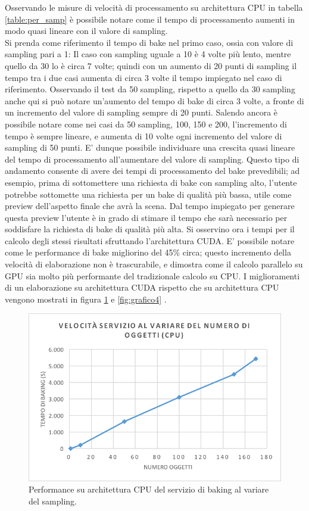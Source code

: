 Osservando le misure di velocità di processamento su architettura CPU in tabella \ref{table:per_samp} è possibile notare come il tempo di processamento aumenti in modo quasi lineare con il valore di sampling.
\\
Si prenda come riferimento il tempo di bake nel primo caso, ossia con valore di sampling pari a 1:
Il caso con sampling uguale a 10 è 4 volte più lento, mentre quello da 30 lo è circa 7 volte; quindi con un aumento di 20 punti di sampling il tempo tra i due casi aumenta di circa 3 volte il tempo impiegato nel caso di riferimento. Osservando il test da 50 sampling, rispetto a quello da 30 sampling anche qui si può notare un’aumento del tempo di bake di circa 3 volte, a fronte di un incremento del valore di sampling sempre di 20 punti. Salendo ancora è possibile notare come nei casi da 50 sampling, 100, 150 e 200, l’incremento di tempo è sempre lineare, e aumenta di 10 volte ogni incremento del valore di sampling di 50 punti. E’ dunque possibile individuare una crescita quasi lineare del tempo di processamento all’aumentare del valore di sampling.
Questo tipo di andamento consente di avere dei tempi di processamento del bake prevedibili; ad esempio, prima di sottomettere una richiesta di bake con sampling alto, l’utente potrebbe sottomette una richiesta per un bake di qualità più bassa, utile come preview dell’aspetto finale che avrà la scena. Dal tempo impiegato per generare questa preview l’utente è in grado di stimare il tempo che sarà necessario per soddisfare la richiesta di bake di qualità più alta. 
Si osservino ora i tempi per il calcolo degli stessi risultati sfruttando l’architettura CUDA. E’ possibile notare come le performance di bake migliorino del 45\% circa; questo incremento della velocità di elaborazione non è trascurabile, e dimostra come il calcolo parallelo su GPU sia molto più performante del tradizionale calcolo su CPU. I miglioramenti di un elaborazione su architettura CUDA rispetto che su architettura CPU vengono mostrati in figura \ref{fig:grafico3} e \ref{fig:grafico4} .
\\
\begin{figure}[htb]
 \centering
 \includegraphics[width=0.7\linewidth]{images/chapter_prove_sperimentali/grafico1.png}\hfill
 \caption[Performance CPU variando sampling]{Performance su architettura CPU del servizio di baking al variare del sampling.}
 \label{fig:grafico3}
\end{figure}
